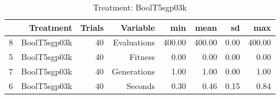 \begin{table}[ht]
\centering
\begin{tabular}{rrrrrrrr}
  \hline
 & Treatment & Trials & Variable & min & mean & sd & max \\ 
  \hline
8 & BoolT5sgp03k &  40 & Evaluations & 400.00 & 400.00 & 0.00 & 400.00 \\ 
  5 & BoolT5sgp03k &  40 & Fitness & 0.00 & 0.00 & 0.00 & 0.00 \\ 
  7 & BoolT5sgp03k &  40 & Generations & 1.00 & 1.00 & 0.00 & 1.00 \\ 
  6 & BoolT5sgp03k &  40 & Seconds & 0.30 & 0.46 & 0.15 & 0.84 \\ 
   \hline
\end{tabular}
\caption{Treatment: BoolT5sgp03k} 
\end{table}

